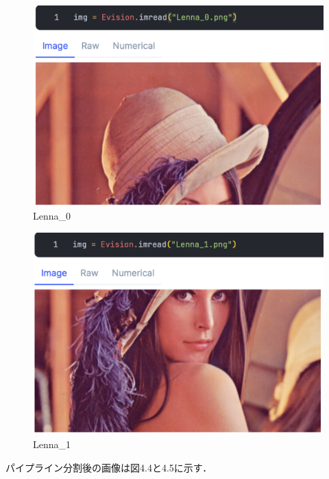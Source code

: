 \documentclass[a4paper]{jreport}	%
\begin{document}
\begin{figure}[H]
\vspace{6cm}
\begin{center}
\hspace{-8cm}
\includegraphics[scale=0.5]{ja/f4.png}
\end{center}
\caption{Lenna\_0}
\end{figure}

\begin{figure}[H]
\vspace{5cm}
\begin{center}
\hspace{-8cm}
\includegraphics[scale=0.5]{ja/f5.png}
\end{center}
\caption{Lenna\_1}
\end{figure}

パイプライン分割後の画像は図4.4と4.5に示す．
\end{document}
